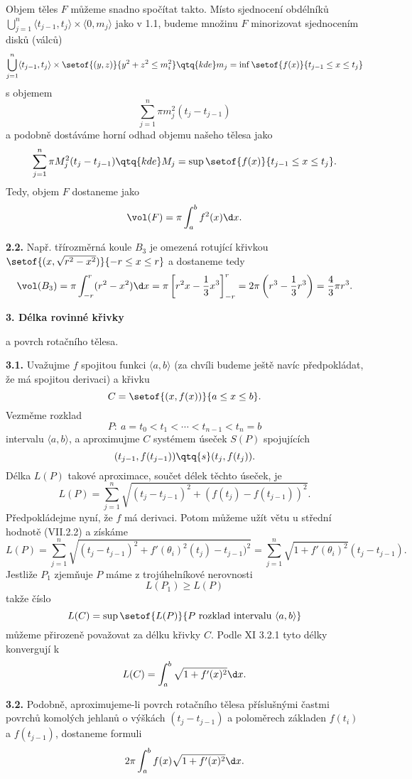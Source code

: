 \documentclass[12pt]{article}
\begin{document}
{ Objem těles $F$ můžeme snadno spočítat takto. Místo sjednocení
 obdélníků 
 $
 \bigcup_{j=1}^n\langle t_{j-1},t_j\rangle\times\langle 0,m_j\rangle
  $
 jako v 1.1,
  budeme množinu  $F$ minorizovat sjednocením disků (válců)
   $$
 \bigcup_{j=1}^n\langle t_{j-1},t_j\rangle\times\setof{(y,z)}{y^2+z^2\leq m_i^2}
 \qtq{kde} m_j=\inf\setof{f(x)}{t_{j-1}\leq x\leq t_j}
 $$
s objemem 
 $$
 \sum_{j=1}^n\pi m_j^2(t_j-t_{j-1})
 $$
a podobně dostáváme horní odhad objemu našeho tělesa jako
 $$
 \sum_{j=1}^n\pi M_j^2(t_j-t_{j-1}) \qtq{kde} M_j=\sup\setof{f(x)}{t_{j-1}\leq x\leq t_j}.
 $$
Tedy, objem $F$ dostaneme jako
$$
\vol(F)=\pi\int_a^b f^2(x)\d x.
$$

\bigskip

{\bf 2.2.} Např. třírozměrná koule $B_3$ je omezená rotující křivkou
$\setof{(x,\sqrt{r^2-x^2})}{-r\leq x\leq r}$ a dostaneme tedy
$$
\vol(B_3)=\pi\int_{-r}^r(r^2-x^2)\d x=\pi\left[r^2x-\frac13 x^3\right]_{-r}^r=
2\pi\left(r^3-\frac13 r^3\right)=\frac43\pi r^3.
$$

\vskip10mm
 
 {\large\bf 3. Délka rovinné křivky
 
 \hskip7mm a povrch rotačního tělesa.} 
 
 \bigskip
 
 {\bf 3.1.} Uvažujme $f$ spojitou funkci $\langle a,b \rangle$
 (za chvíli budeme ještě navíc předpokládat, že má spojitou derivaci) a křivku
 $$
  C=\setof{(x,f(x))}{a\leq x\leq b}.
  $$
  Vezměme rozklad
  $$
   P:\ a=t_0< t_1<\cdots<t_{n-1}< t_n=b
   $$
intervalu $\langle a,b\rangle$,  a aproximujme $C$ systémem úseček $S(P)$ spojujících
$$
(t_{j-1},f(t_{j-1})) \qtq{s} (t_j,f(t_j)).
$$
Délka $L(P)$ takové aproximace, součet délek těchto úseček, je
$$
L(P)=\sum_{j=1}^n\sqrt{(t_j-t_{j-1})^2+(f(t_j)-f(t_{j-1}))^2}.
$$
Předpokládejme nyní, že $f$ má derivaci. Potom můžeme užít větu u střední hodnotě (VII.2.2) a získáme
$$
L(P)=\sum_{j=1}^n\sqrt{(t_j-t_{j-1})^2+f'(\theta_i)^2(t_j)-t_{j-1})^2}=\sum_{j=1}^n\sqrt{1+f'(\theta_i)^2}(t_j-t_{j-1}).
$$
Jestliže $P_1$ zjemňuje $P$ máme z trojúhelníkové nerovnosti
$$
L(P_1)\geq L(P)
$$
takže číslo
$$
L(C)=\sup\setof{L(P)}{P\ \text{rozklad intervalu} \ \langle a,b\rangle}
$$
můžeme přirozeně považovat za délku křivky $C$. Podle XI 3.2.1 tyto délky konvergují k
$$
L(C)=\int_a^b\sqrt{1+f'(x)^2}\d x.
$$

\bigskip

{\bf 3.2.} Podobně, aproximujeme-li povrch rotačního tělesa příslušnými častmi povrchů komolých jehlanů o výškách  $(t_j-t_{j-1})$ a poloměrech základen $f(t_i)$ a $f(t_{j-1})$, dostaneme formuli
$$
2\pi\int_a^b f(x)\sqrt{1+f'(x)^2}\d x.
$$


}
\end{document}

